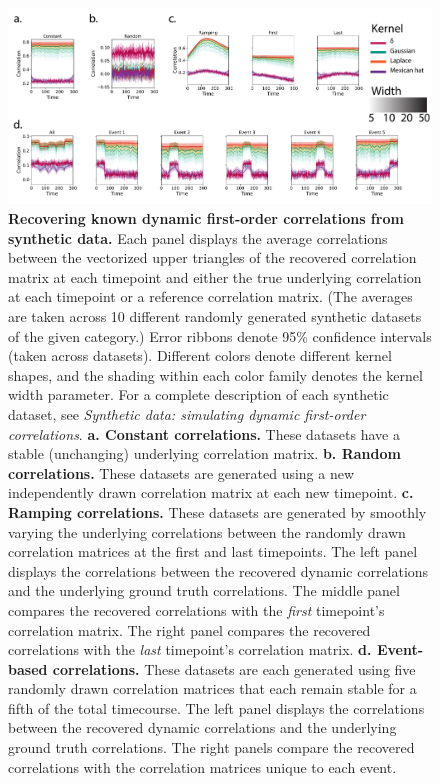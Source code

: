 \documentclass[english]{article}
\begin{document}
\begin{figure}[tp]
  \centering
  \includegraphics[width=\textwidth]{figs/synthetic_data}
  \caption{\textbf{Recovering known dynamic first-order correlations
      from synthetic data.}  Each panel displays the average
    correlations between the vectorized upper triangles of the
    recovered correlation matrix at each timepoint and either the true
    underlying correlation at each timepoint or a reference
    correlation matrix.  (The averages are taken across 10 different
    randomly generated synthetic datasets of the given category.)
    Error ribbons denote 95\% confidence intervals (taken across
    datasets). Different colors denote different kernel shapes, and
    the shading within each color family denotes the kernel width
    parameter.  For a complete description of each synthetic dataset,
    see \textit{Synthetic data: simulating dynamic first-order
      correlations}.  \textbf{a. Constant correlations.}  These
    datasets have a stable (unchanging) underlying correlation matrix.
    \textbf{b. Random correlations.}  These datasets are generated
    using a new independently drawn correlation matrix at each new
    timepoint.  \textbf{c. Ramping correlations.}  These datasets are
    generated by smoothly varying the underlying correlations between
    the randomly drawn correlation matrices at the first and last
    timepoints.  The left panel displays the correlations between the
    recovered dynamic correlations and the underlying ground truth
    correlations.  The middle panel compares the recovered
    correlations with the \textit{first} timepoint's correlation
    matrix.  The right panel compares the recovered correlations with
    the \textit{last} timepoint's correlation matrix.
    \textbf{d. Event-based correlations.}  These datasets are each
    generated using five randomly drawn correlation matrices that each
    remain stable for a fifth of the total timecourse.  The left panel
    displays the correlations between the recovered dynamic
    correlations and the underlying ground truth correlations.  The
    right panels compare the recovered correlations with the
    correlation matrices unique to each event.}
  \label{fig:synthetic}
\end{figure}
\end{document}

